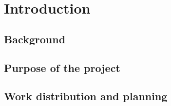 \section{Introduction}%
\label{sec:introduction}

\subsection{Background}%
\label{sub:background}

\subsection{Purpose of the project}%
\label{sub:purpose_of_the_project}

\subsection{Work distribution and planning}%
\label{sub:work_distribution_and_planning}

